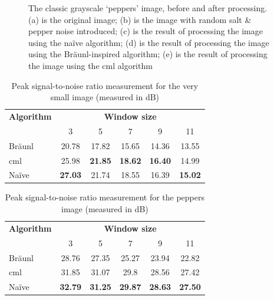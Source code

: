 \begin{figure}
\caption[The classic grayscale `peppers' image, before and after processing]{\label{fig:median:peppers}The classic grayscale `peppers' image, before and after processing.  (a) is the original image; (b) is the image with random salt \& pepper noise introduced; (c) is the result of processing the image using the naïve algorithm; (d) is the result of processing the image using the Br\"{a}unl-inspired algorithm; (e) is the result of processing the image using the \gls{cml} algorithm}
\end{figure}

\begin{table}
\centering
\caption[Peak signal-to-noise for the very small image]{Peak signal-to-noise ratio measurement for the very small image (measured in dB)}
\label{tab:median:psnrvsmall}
\begin{tabular}{@{}lccccc@{}}
\toprule
\multicolumn{1}{c}{\textbf{Algorithm}} & \multicolumn{5}{c}{\textbf{Window size}}                                          \\
                                       & 3              & 5              & 7              & 9             & 11             \\ \midrule
Bräunl                                 & 20.78          & 17.82          & 15.65          & 14.36         & 13.55          \\
\gls{cml}                                    & 25.98          & \textbf{21.85} & \textbf{18.62} & \textbf{16.40} & 14.99          \\
Naïve                                  & \textbf{27.03} & 21.74          & 18.55          & 16.39         & \textbf{15.02} \\ \bottomrule
\end{tabular}
\end{table}

\begin{table}
\centering
\caption[Peak signal-to-noise for the peppers image]{Peak signal-to-noise ratio measurement for the peppers image (measured in dB)}
\begin{tabular}{@{}lccccc@{}}
\toprule
\multicolumn{1}{c}{\textbf{Algorithm}} & \multicolumn{5}{c}{\textbf{Window size}}                                          \\
                                       & 3              & 5              & 7              & 9              & 11            \\ \midrule
Bräunl                                 & 28.76          & 27.35          & 25.27          & 23.94          & 22.82         \\
\gls{cml}                                    & 31.85          & 31.07          & 29.8           & 28.56          & 27.42         \\
Naïve                                  & \textbf{32.79} & \textbf{31.25} & \textbf{29.87} & \textbf{28.63} & \textbf{27.50} \\ \bottomrule
\end{tabular}
\label{tab:median:psnrpeppers}
\end{table}

